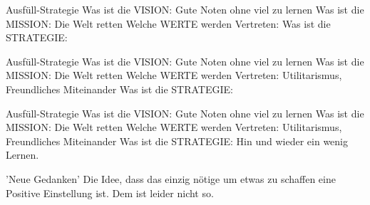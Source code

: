 \begin{frame}[c]{Ausfüll-Strategie}
    Was ist die VISION:
    \newline
    Gute Noten ohne viel zu lernen
    \newline
    \newline
    Was ist die MISSION:
    \newline
    Die Welt retten
    \newline
    \newline
    Welche WERTE werden Vertreten:
    \newline
    \newline
    \newline
    Was ist die STRATEGIE:
    \newline
    \newline
\end{frame}


\begin{frame}[c]{Ausfüll-Strategie}
    Was ist die VISION:
    \newline
    Gute Noten ohne viel zu lernen
    \newline
    \newline
    Was ist die MISSION:
    \newline
    Die Welt retten
    \newline
    \newline
    Welche WERTE werden Vertreten:
    \newline
    Utilitarismus, Freundliches Miteinander
    \newline
    \newline
    Was ist die STRATEGIE:
    \newline
    \newline
\end{frame}


\begin{frame}[c]{Ausfüll-Strategie}
    Was ist die VISION:
    \newline
    Gute Noten ohne viel zu lernen
    \newline
    \newline
    Was ist die MISSION:
    \newline
    Die Welt retten
    \newline
    \newline
    Welche WERTE werden Vertreten:
    \newline
    Utilitarismus, Freundliches Miteinander
    \newline
    \newline
    Was ist die STRATEGIE:
    \newline
    Hin und wieder ein wenig Lernen.
    \newline
\end{frame}



\begin{frame}[c]{'Neue Gedanken'}
    \LARGE
    Die Idee, dass das einzig nötige um etwas zu schaffen eine Positive Einstellung ist.
    \pause
    \newline
    \newline
    Dem ist leider nicht so.
\end{frame}



